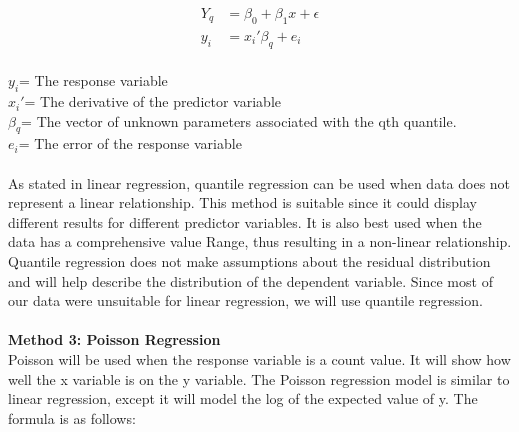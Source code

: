 \documentclass[11pt,letterpaper]{amsart}
\begin{document}
\begin{align*}
Y_q&=\beta_0 + \beta_1x+\epsilon\\
y_i&=x_i'\beta_q+e_i
\end{align*}
\\
\textbf{$y_i$}= The response variable\\
\textbf{$x_i'$}= The derivative of the predictor variable\\
\textbf{$\beta_q$}= The vector of unknown parameters associated with the qth quantile.\\
\textbf{$e_i$}= The error of the response variable\\
\cite{2}\\
\indent As stated in linear regression, quantile regression can be used when data does not represent a linear relationship. This method is suitable since it could display different results for different predictor variables. It is also best used when the data has a comprehensive value Range, thus resulting in a non-linear relationship. Quantile regression does not make assumptions about the residual distribution and will help describe the distribution of the dependent variable. Since most of our data were unsuitable for linear regression, we will use quantile regression.
\\\\
\noindent \large \textbf{Method 3: Poisson Regression}\\
\indent Poisson will be used when the response variable is a count value. It will show how well the x variable is on the y variable. The Poisson regression model is similar to linear regression, except it will model the log of the expected value of y. The formula is as follows:
\end{document}
